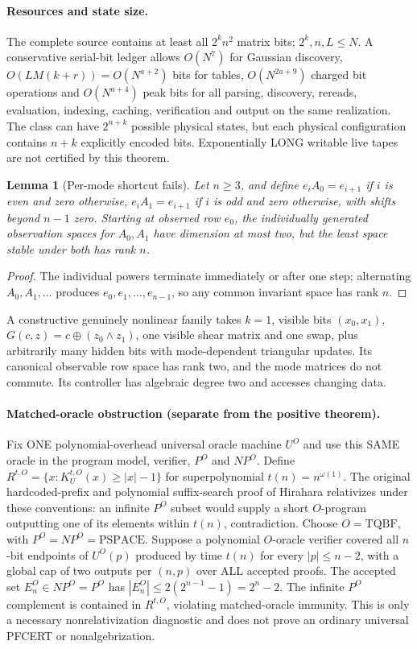 \documentclass[11pt]{article}
\newtheorem{lemma}[theorem]{Lemma}
\begin{document}
\paragraph{Resources and state size.}
The complete source contains at least all $2^k n^2$ matrix bits; $2^k,n,L\le N$. A conservative serial-bit ledger allows $O(N^7)$ for Gaussian discovery, $O(LM(k+r))=O(N^{a+2})$ bits for tables, $O(N^{2a+9})$ charged bit operations and $O(N^{a+4})$ peak bits for all parsing, discovery, rereads, evaluation, indexing, caching, verification and output on the same realization. The class can have $2^{n+k}$ possible physical states, but each physical configuration contains $n+k$ explicitly encoded bits. Exponentially LONG writable live tapes are not certified by this theorem.

\begin{lemma}[Per-mode shortcut fails]
Let $n\ge3$, and define $e_iA_0=e_{i+1}$ if $i$ is even and zero otherwise, $e_iA_1=e_{i+1}$ if $i$ is odd and zero otherwise, with shifts beyond $n-1$ zero. Starting at observed row $e_0$, the individually generated observation spaces for $A_0,A_1$ have dimension at most two, but the least space stable under both has rank $n$.
\end{lemma}
\begin{proof} The individual powers terminate immediately or after one step; alternating $A_0,A_1,\ldots$ produces $e_0,e_1,\ldots,e_{n-1}$, so any common invariant space has rank $n$.\end{proof}
A constructive genuinely nonlinear family takes $k=1$, visible bits $(x_0,x_1)$, $G(c,z)=c\oplus(z_0\wedge z_1)$, one visible shear matrix and one swap, plus arbitrarily many hidden bits with mode-dependent triangular updates. Its canonical observable row space has rank two, and the mode matrices do not commute. Its controller has algebraic degree two and accesses changing data.

\paragraph{Matched-oracle obstruction (separate from the positive theorem).}
Fix ONE polynomial-overhead universal oracle machine $U^O$ and use this SAME oracle in the program model, verifier, $P^O$ and $NP^O$. Define $R^{t,O}=\{x:K_U^{t,O}(x)\ge |x|-1\}$ for superpolynomial $t(n)=n^{\omega(1)}$. The original hardcoded-prefix and polynomial suffix-search proof of Hirahara relativizes under these conventions: an infinite $P^O$ subset would supply a short $O$-program outputting one of its elements within $t(n)$, contradiction. Choose $O=\mathrm{TQBF}$, with $P^O=NP^O=\mathrm{PSPACE}$. Suppose a polynomial $O$-oracle verifier covered all $n$-bit endpoints of $U^O(p)$ produced by time $t(n)$ for every $|p|\le n-2$, with a global cap of two outputs per $(n,p)$ over ALL accepted proofs. The accepted set $E^O_n\in NP^O=P^O$ has $|E^O_n|\le2(2^{n-1}-1)=2^n-2$. The infinite $P^O$ complement is contained in $R^{t,O}$, violating matched-oracle immunity. This is only a necessary nonrelativization diagnostic and does not prove an ordinary universal PFCERT or nonalgebrization.
\end{document}
